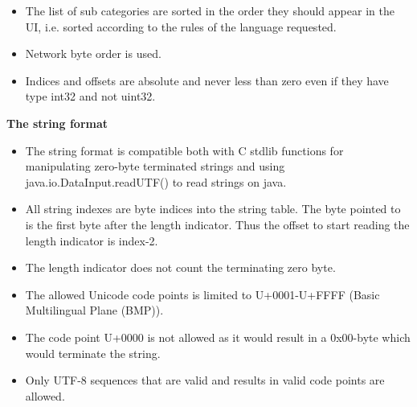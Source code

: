 \begin{itemize}
\item The list of sub categories are sorted in the order they should appear in the UI, 
i.e. sorted according to the rules of the language requested.
\item Network byte order is used.
\item Indices and offsets are absolute and never less than zero even if they have type 
int32 and not uint32.
\end{itemize}

\textbf{The string format}
\begin{itemize}
\item The string format is compatible both with C stdlib functions for manipulating 
zero-byte terminated strings and using java.io.DataInput.readUTF() to read 
strings on java.

\item All string indexes are byte indices into the string table. The byte pointed to
is the first byte after the length indicator. Thus the offset to start reading 
the length indicator is index-2.

\item The length indicator does not count the terminating zero byte.
\item The allowed Unicode code points is limited to U+0001-U+FFFF (Basic Multilingual 
Plane (BMP)). 

\item The code point U+0000 is not allowed as it would result in a 0x00-byte which 
would terminate the string.

\item Only UTF-8 sequences that are valid and results in valid code points are allowed.
\end{itemize}
